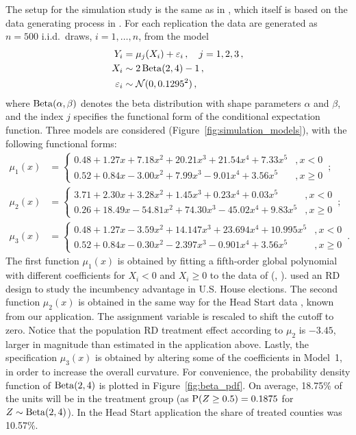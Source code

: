 The setup for the simulation study is the same as in \textcite{Calonico_2014},
which itself is based on the data generating process in \textcite{Imbens_2012}.
For each replication the data are generated as $n = 500$ i.i.d.\ draws, $i = 1, \dots, n$, from the model
\begin{align}
	Y_i &= \mu_{j}(X_i) + \varepsilon_i \,, \quad j = 1, 2, 3 \,, \\
	X_i &\sim 2 \operatorname{Beta}(2, 4) -1 \,, \\
	\varepsilon_i &\sim \mathcal{N}(0, 0.1295^2) \,,
\end{align}
where $\operatorname{Beta}(\alpha, \beta)$ denotes the beta distribution with shape parameters $\alpha$ and $\beta$,
and the index $j$ specifies the functional form of the conditional expectation function.
Three models are considered (Figure~\ref{fig:simulation_models}), with the following functional forms:
\begin{align}
	\mu_{1}(x) &=
	\begin{cases}
		0.48 + 1.27x + 7.18x^2 + 20.21x^3 + 21.54x^4 + 7.33x^5 & , x < 0 \\
		0.52 + 0.84x - 3.00x^2 + 7.99x^3 - 9.01x^4 + 3.56x^5   & , x \geq 0
	\end{cases} \,; \\
	\mu_{2}(x) &=
	\begin{cases}
		3.71 + 2.30x + 3.28x^2 + 1.45x^3 + 0.23x^4 + 0.03x^5 	 & , x < 0 \\
		0.26 + 18.49x - 54.81x^2 + 74.30x^3 - 45.02x^4 + 9.83x^5 & , x \geq 0 
	\end{cases} \,; \\ 
	\mu_{3}(x) &=
	\begin{cases}
		0.48 + 1.27x - 3.59x^2 + 14.147x^3 + 23.694x^4 + 10.995x^5 & , x < 0 \\
		0.52 + 0.84x - 0.30x^2 - 2.397x^3 - 0.901x^4 + 3.56x^5     & , x \geq 0 
	\end{cases} \,.
\end{align}
The first function $\mu_{1}(x)$ is obtained by fitting a fifth-order global polynomial 
with different coefficients for $X_i < 0$ and $X_i \geq 0$ to the data of
\citeauthor{Lee_2008} (\citeyear{Lee_2008}, ).
\citeauthor{Lee_2008} used an RD design to study the incumbency advantage in U.S. House elections. 
The second function $\mu_{2}(x)$ is obtained in the same way for the Head Start data \parencite{Ludwig_2007},
known from our application.
The assignment variable is rescaled to shift the cutoff to zero.
Notice that the population RD treatment effect according to $\mu_{2}$ is $-3.45$,
larger in magnitude than estimated in the application above.
Lastly, the specification $\mu_{3}(x)$ is obtained by altering some of the coefficients in Model~1,
in order to increase the overall curvature.
For convenience, the probability density function of $\operatorname{Beta}(2, 4)$ is plotted in Figure~\ref{fig:beta_pdf}.
On average, 18.75\% of the units will be in the treatment group (as $\operatorname{P}(Z \geq 0.5) = 0.1875$ for $Z \sim \operatorname{Beta}(2, 4)$).
In the Head Start application the share of treated counties was 10.57\%.   

